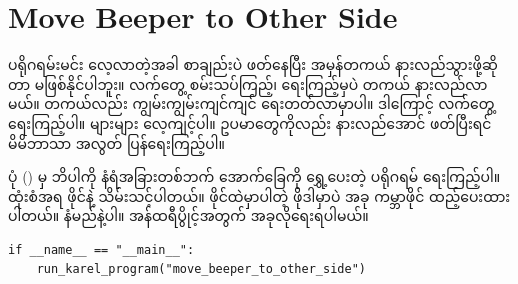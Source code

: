 \section{Move Beeper to Other Side}
ပရိုဂရမ်းမင်း လေ့လာတဲ့အခါ စာချည်းပဲ ဖတ်နေပြီး အမှန်တကယ် နားလည်သွားဖို့ဆိုတာ မဖြစ်နိုင်ပါဘူး။ လက်တွေ့ စမ်းသပ်ကြည့်၊ ရေးကြည့်မှပဲ တကယ် နားလည်လာမယ်။ တကယ်လည်း ကျွမ်းကျွမ်းကျင်ကျင် ရေးတတ်လာမှာပါ။ ဒါကြောင့် လက်တွေ့ရေးကြည့်ပါ။ များများ လေ့ကျင့်ပါ။ ဥပမာတွေကိုလည်း နားလည်အောင် ဖတ်ပြီးရင် မိမိဘာသာ အလွတ် ပြန်ရေးကြည့်ပါ။ 

ပုံ (\fRefNo{\ref{fig:mbtos}}) မှ ဘိပါကို နံရံအခြားတစ်ဘက် အောက်ခြေကို ရွှေ့ပေးတဲ့ ပရိုဂရမ် ရေးကြည့်ပါ။  ထုံးစံအရ  ဖိုင်နဲ့ သိမ်းသင့်ပါတယ်။ ဖိုင်ထဲမှာပါတဲ့  ဖိုဒါမှာပဲ အခု ကမ္ဘာဖိုင် ထည့်ပေးထားပါတယ်။  နံမည်နဲ့ပါ။ အန်ထရီပွိုင့်အတွက် အခုလိုရေးရပါမယ်။

\setlength{\fboxsep}{0pt}
\begin{verbatim}
if __name__ == "__main__":
    run_karel_program("move_beeper_to_other_side")
\end{verbatim}

\begin{figure}[tbh!]
\caption{} 
\label{fig:mbtos}
\end{figure}




%

%

